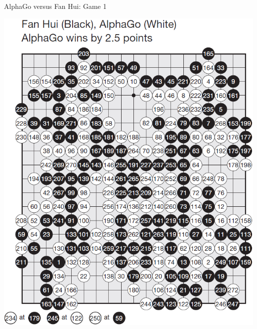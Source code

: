 \documentclass{beamer}
\begin{document}
  {

    \begin{frame}{AlphaGo versus Fan Hui: Game 1}
      \begin{center}
        \includegraphics[height=.9\textheight]{../img/AlphaGo_vs_Fan_Hui_Game_1.png}
      \end{center}
    \end{frame}

}
\end{document}
